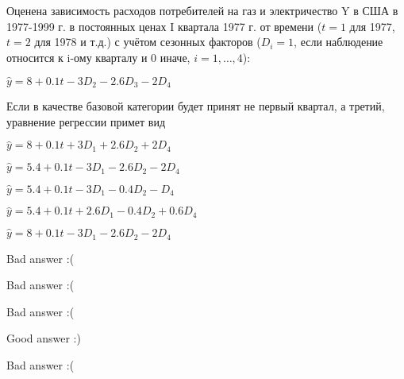 
\begin{question}
Оценена зависимость расходов потребителей на газ и электричество Y в США в 1977-1999 г. в постоянных ценах I квартала 1977 г. от времени (\(t = 1\) для 1977, \(t = 2\) для 1978 и т.д.) с учётом сезонных факторов (\(D_i = 1\), если наблюдение относится к i-ому кварталу и 0 иначе, \(i = 1, \ldots, 4\)):

\(\hat y = 8 + 0.1t - 3 D_2 - 2.6 D_3 - 2 D_4\)

Если в качестве базовой категории будет принят не первый квартал, а третий, уравнение регрессии примет вид
\begin{answerlist}
  \item \(\hat y = 8 + 0.1t + 3 D_1 + 2.6 D_2 + 2D_4\)
  \item \(\hat y = 5.4 + 0.1t - 3 D_1 - 2.6 D_2 - 2 D_4\)
  \item \(\hat y = 5.4 + 0.1t - 3 D_1 - 0.4 D_2 - D_4\)
  \item \(\hat y = 5.4 + 0.1t + 2.6 D_1 - 0.4 D_2 + 0.6D_4\)
  \item \(\hat y = 8 + 0.1t - 3 D_1 - 2.6 D_2 - 2 D_4\)
\end{answerlist}
\end{question}

\begin{solution}
\begin{answerlist}
  \item Bad answer :(
  \item Bad answer :(
  \item Bad answer :(
  \item Good answer :)
  \item Bad answer :(
\end{answerlist}
\end{solution}

